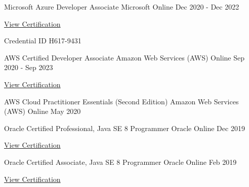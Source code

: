 

\begin{cventries}

  \cventry
    {Microsoft Azure Developer Associate} %
    {Microsoft} %
    {Online} %
    {Dec 2020 - Dec 2022} %
    {
      \begin{cvitems} %
        \item \href{https://www.youracclaim.com/badges/28184da4-1583-4d34-8243-03ece8c36e89}{View Certification}
        \item Credential ID H617-9431
      \end{cvitems}
    }
  
  \cventry
    {AWS Certified Developer Associate} %
    {Amazon Web Services (AWS)} %
    {Online} %
    {Sep 2020 - Sep 2023} %
    {
      \begin{cvitems} %
        \item \href{https://www.youracclaim.com/badges/4cbe824e-bb12-47fe-9189-e4dc24e71f9b}{View Certification}
      \end{cvitems}
    }
  
  \cventry
    {AWS Cloud Practitioner Essentials (Second Edition)} %
    {Amazon Web Services (AWS)} %
    {Online} %
    {May 2020} %
    {
    }
    
  \cventry
    {Oracle Certified Professional, Java SE 8 Programmer} %
    {Oracle} %
    {Online} %
    {Dec 2019} %
    {
      \begin{cvitems} %
        \item \href{https://www.youracclaim.com/badges/f1b3976a-e2c4-4c5c-ae9c-679ba57f605e}{View Certification}
      \end{cvitems}
    }
    
  \cventry
    {Oracle Certified Associate, Java SE 8 Programmer} %
    {Oracle} %
    {Online} %
    {Feb 2019} %
    {
      \begin{cvitems} %
        \item \href{https://www.youracclaim.com/badges/35ec5e10-1bda-4e4c-8fe9-39cd3ccb0625}{View Certification}
      \end{cvitems}
    }
    

\end{cventries}
